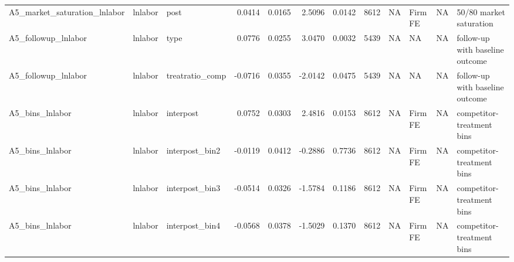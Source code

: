 \begin{table}
\begin{tabular}[t]{lllrrrrrrlll}
A5\_market\_saturation\_lnlabor & lnlabor & post & 0.0414 & 0.0165 & 2.5096 & 0.0142 & 8612 & NA & Firm FE & NA & 50/80 market saturation\\
A5\_followup\_lnlabor & lnlabor & type & 0.0776 & 0.0255 & 3.0470 & 0.0032 & 5439 & NA & NA & NA & follow-up with baseline outcome\\
A5\_followup\_lnlabor & lnlabor & treatratio\_comp & -0.0716 & 0.0355 & -2.0142 & 0.0475 & 5439 & NA & NA & NA & follow-up with baseline outcome\\
A5\_bins\_lnlabor & lnlabor & interpost & 0.0752 & 0.0303 & 2.4816 & 0.0153 & 8612 & NA & Firm FE & NA & competitor-treatment bins\\
\addlinespace
A5\_bins\_lnlabor & lnlabor & interpost\_bin2 & -0.0119 & 0.0412 & -0.2886 & 0.7736 & 8612 & NA & Firm FE & NA & competitor-treatment bins\\
A5\_bins\_lnlabor & lnlabor & interpost\_bin3 & -0.0514 & 0.0326 & -1.5784 & 0.1186 & 8612 & NA & Firm FE & NA & competitor-treatment bins\\
A5\_bins\_lnlabor & lnlabor & interpost\_bin4 & -0.0568 & 0.0378 & -1.5029 & 0.1370 & 8612 & NA & Firm FE & NA & competitor-treatment bins\\
\bottomrule
\end{tabular}
\end{table}
